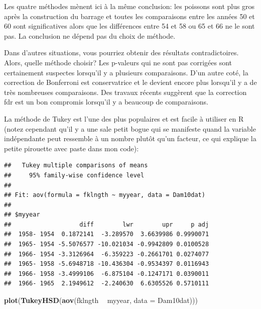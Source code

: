 \documentclass[12pt,]{book}
\newenvironment{Shaded}{\begin{snugshade}}{\end{snugshade}}
\newcommand{\DataTypeTok}[1]{\textcolor[rgb]{0.27,0.27,0.27}{#1}}
\newcommand{\KeywordTok}[1]{\textcolor[rgb]{0.27,0.27,0.27}{\textbf{#1}}}
\newcommand{\NormalTok}[1]{#1}
\newcommand{\OperatorTok}[1]{\textcolor[rgb]{0.43,0.43,0.43}{\textbf{#1}}}
\newcommand{\StringTok}[1]{\textcolor[rgb]{0.5,0.5,0.5}{#1}}
\begin{document}
Les quatre méthodes mènent ici à la même conclusion: les poissons sont plus gros après la construction du barrage et toutes les comparaisons entre les années 50 et 60 sont significatives alors que les différences entre 54 et 58 ou 65 et 66 ne le sont pas. La conclusion ne dépend pas du choix de méthode.

Dans d'autres situations, vous pourriez obtenir des résultats contradictoires. Alors, quelle méthode choisir? Les p-valeurs qui ne sont pas corrigées sont certainement suspectes lorsqu'il y a plusieurs comparaisons. D'un autre coté, la correction de Bonferroni est conservatrice et le devient encore plus lorsqu'il y a de très nombreuses comparaisons. Des travaux récents suggèrent que la correction fdr est un bon compromis lorsqu'il y a beaucoup de comparaisons.

La méthode de Tukey est l'une des plus populaires et est facile à utiliser en R (notez cependant qu'il y a une sale petit bogue qui se manifeste quand la variable indépendante peut ressemble à un nombre plutôt qu'un facteur, ce qui explique la petite pirouette avec paste dans mon code):

\begin{Shaded}
\end{Shaded}

\begin{verbatim}
##   Tukey multiple comparisons of means
##     95% family-wise confidence level
## 
## Fit: aov(formula = fklngth ~ myyear, data = Dam10dat)
## 
## $myyear
##                   diff        lwr        upr     p adj
##  1958- 1954  0.1872141  -3.289570  3.6639986 0.9990071
##  1965- 1954 -5.5076577 -10.021034 -0.9942809 0.0100528
##  1966- 1954 -3.3126964  -6.359223 -0.2661701 0.0274077
##  1965- 1958 -5.6948718 -10.436304 -0.9534397 0.0116943
##  1966- 1958 -3.4999106  -6.875104 -0.1247171 0.0390011
##  1966- 1965  2.1949612  -2.240630  6.6305526 0.5710111
\end{verbatim}

\begin{Shaded}
\begin{Highlighting}[]
\KeywordTok{plot}\NormalTok{(}\KeywordTok{TukeyHSD}\NormalTok{(}\KeywordTok{aov}\NormalTok{(fklngth }\OperatorTok{~}\StringTok{ }\NormalTok{myyear, }\DataTypeTok{data =}\NormalTok{ Dam10dat)))}
\end{Highlighting}
\end{Shaded}
\end{document}
